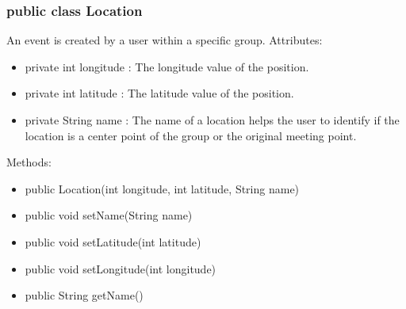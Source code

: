 	\subsubsection{public class Location}
	An event is created by a user within a specific group.
	\newline Attributes:
	\begin{itemize}
	\item private  int longitude : The longitude value of the position.
	\item private  int latitude : The latitude value of the position.
	\item private String name : The name of a location helps the user to identify if the location is a center point of the group or the original meeting point.
	\end{itemize}
	Methods:
	\begin{itemize}
	\item public Location(int longitude, int latitude, String name)
	\item public void setName(String name)
	\item public void setLatitude(int latitude)
	\item public void setLongitude(int longitude)
	\item public String getName()

\end{itemize}
